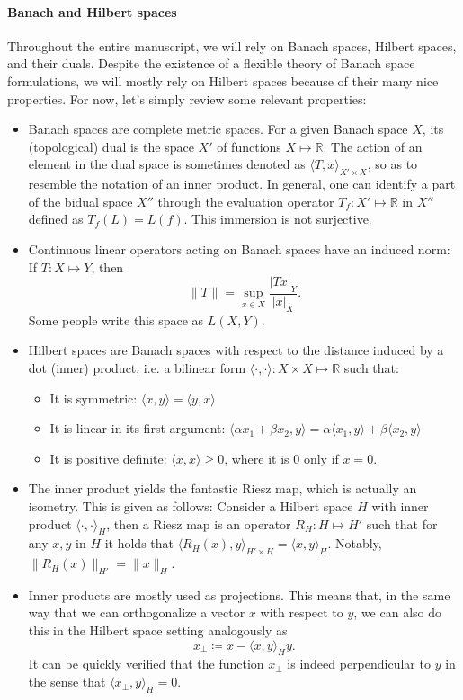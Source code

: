\documentclass{article}
\newcommand{\R}{\mathbb{R}}
\begin{document}
\paragraph{Banach and Hilbert spaces} Throughout the entire manuscript, we will rely on Banach spaces, Hilbert spaces, and their duals. Despite the existence of a flexible theory of Banach space formulations, we will mostly rely on Hilbert spaces because of their many nice properties. For now, let's simply review some relevant properties: 
    \begin{itemize}
        \item Banach spaces are complete metric spaces. For a given Banach space $X$, its (topological) dual is the space $X'$ of functions $X\mapsto \R$. The action of an element in the dual space is sometimes denoted as $\langle T, x\rangle_{X'\times X}$, so as to resemble the notation of an inner product. In general, one can identify a part of the bidual space $X''$ through the evaluation operator $T_f:X'\mapsto \R$ in $X''$ defined as $T_f(L) = L(f)$. This immersion is not surjective. 
        \item Continuous linear operators acting on Banach spaces have an induced norm: If $T: X\mapsto Y$, then 
            $$ \| T\| =  \sup_{x\in X}\frac{|Tx|_Y}{|x|_X}. $$
        Some people write this space as $L(X,Y)$. 
        \item Hilbert spaces are Banach spaces with respect to the distance induced by a dot (inner) product, i.e. a bilinear form $\langle\cdot, \cdot \rangle: X\times X\mapsto \R $ such that: 
            \begin{itemize}
                \item It is symmetric: $\langle x,y\rangle = \langle y, x\rangle$
                \item It is linear in its first argument: $\langle \alpha x_1 + \beta x_2, y\rangle=\alpha\langle x_1, y\rangle + \beta\langle x_2, y\rangle$
                \item It is positive definite: $\langle x,x\rangle \geq 0$, where it is 0 only if $x=0$.
            \end{itemize}
        \item The inner product yields the fantastic Riesz map, which is actually an isometry. This is given as follows: Consider a Hilbert space $H$ with inner product $\langle\cdot, \cdot\rangle_H$, then a Riesz map is an operator $R_H: H\mapsto H'$ such that for any $x,y$ in $H$ it holds that $\langle R_H(x), y\rangle_{H'\times H} = \langle x, y\rangle_H$. Notably, $\|R_H(x)\|_{H'} = \| x \|_H$. 
        \item Inner products are mostly used as projections. This means that, in the same way that we can orthogonalize a vector $x$ with respect to $y$, we can also do this in the Hilbert space setting analogously as 
            $$ x_\perp \coloneqq x - \langle x, y\rangle_H y. $$
        It can be quickly verified that the function $x_\perp$ is indeed perpendicular to $y$ in the sense that $\langle x_\perp, y\rangle_H=0$. 
    \end{itemize}
\end{document}
